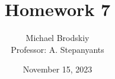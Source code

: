 


\title{Homework 7}
\date{November 15, 2023}
\author{Michael Brodskiy\\ \small Professor: A. Stepanyants}



\maketitle

